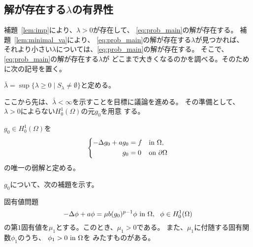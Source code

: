 \subsection{解が存在する$\lambda$の有界性}

補題~\ref{lem:imp}により、$\lambda > 0$が存在して、
\ref{eq:prob_main}の解が存在する。
補題~\ref{lem:minimal_va}により、
\ref{eq:prob_main}の解が存在する$\lambda$が見つかれば、
それより小さい$\lambda$については、\ref{eq:prob_main}の解が存在する。
そこで、\ref{eq:prob_main}の解が存在する$\lambda$が
どこまで大きくなるのかを調べる。そのために次の記号を置く。

\begin{nota} \label{nota:ext}
 $\bar{\lambda} = \sup \{ \lambda \geq 0 \mid S_\lambda \neq \emptyset
 \}$と定める。
\end{nota}

ここから先は、$\bar{\lambda} < \infty$を示すことを目標に議論を進める。
その準備として、$\lambda > 0$によらない$H_0^1(\Omega)$の元$g_0$を用意
する。

\begin{nota} \label{nota:g_0}
 $g_0 \in H_0^1(\Omega)$を
 \begin{align}
  \left\{
  \begin{aligned}
   -\Delta g_0 + a g_0 
    &= f  & &\text{in}~ \Omega,  \\
   g_0 &= 0 & &\text{on}~ \partial\Omega
  \end{aligned}
  \right. \label{eq:g_0}
 \end{align}
 の唯一の弱解と定める。 
\end{nota}
 
$g_0$について、次の補題を示す。

\begin{lem} \label{lem:g_0}
 固有値問題
 \[
  -\Delta \phi + a \phi = \mu b (g_0)^{p-1}\phi ~\text{in}~ \Omega, \ \
 \phi \in H_0^1(\Omega)
 \]
 の第$1$固有値を$\mu_1$とする。このとき、$\mu_1 > 0$である。
 また、$\mu_1$に付随する固有関数$\phi_1$のうち、
 $\phi_1 > 0 ~\text{in}~ \Omega$を
 みたすものがある。
\end{lem}

